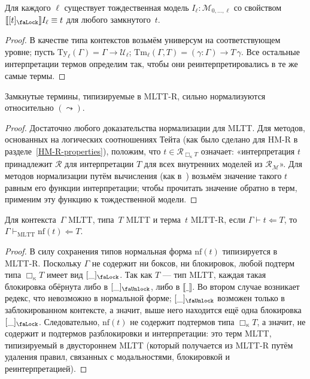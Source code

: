 \begin{theorem}
    Для каждого $\ell$ существует тождественная модель
    $I_\ell:\mathcal{M}_{0,\ldots,\ell}$ со свойством
    $\llbracket [t]_\text{\faLock}\rrbracket I_\ell
    \equiv t$ для любого замкнутого~$t$.
\end{theorem}
\begin{proof}
    В качестве типа контекстов возьмём универсум на
    соответствующем уровне; пусть
    $\mathrm{Ty}_\ell(\Gamma)=
    \Gamma\to\mathcal{U}_\ell$;
    $\mathrm{Tm}_\ell(\Gamma, T)=(\gamma:\Gamma)\to
    T\,\gamma$. Все остальные интерпретации термов
    определим так, чтобы они реинтерпретировались в те
    же самые термы.
\end{proof}

\begin{theorem}
    \label{mltt-r-sn}
    Замкнутые термины, типизируемые в MLTT-R, сильно
    нормализуются относительно $(\leadsto)$.
\end{theorem}
\begin{proof}
    Достаточно любого доказательства нормализации для
    MLTT. Для методов, основанных на логических
    соотношениях Тейта (как было сделано для HM-R в
    разделе~\ref{HM-R-properties}), положим, что
    $t\in\mathcal{R}_{\Box_\kappa T}$ означает:
    «интерпретация $t$ принадлежит $\mathcal{R}$ для
    интерпретации $T$ для всех внутренних моделей из
    $\mathcal{R}_\mathcal{M}$». Для методов
    нормализации путём вычисления (как
    в~\cite{ABEL200717}) возьмём значение такого $t$
    равным его функции интерпретации; чтобы прочитать
    значение обратно в терм, применим эту функцию к
    тождественной модели.
\end{proof}

\begin{theorem}
    Для контекста~$\Gamma$ MLTT, типа~$T$ MLTT и
    терма~$t$ MLTT-R, если
    $\Gamma\vdash t\Leftarrow T$, то
    $\Gamma\vdash_\mathrm{MLTT}\mathrm{nf}(t)
        \Leftarrow T$.
\end{theorem}
\begin{proof}
    В силу сохранения типов нормальная форма
    $\mathrm{nf}(t)$ типизируется в MLTT-R. Поскольку
    $\Gamma$ не содержит ни боксов, ни блокировок,
    любой подтерм типа $\Box_\kappa T$ имеет вид
    $[\_]_\text{\faLock}$. Так как $T$ --- тип MLTT,
    каждая такая блокировка обёрнута либо в
    $[\_]_\text{\faUnlock}$, либо в
    $\llbracket\_ \rrbracket$. Во втором случае
    возникает редекс, что невозможно в нормальной
    форме; $[\_]_\text{\faUnlock}$ возможен только в
    заблокированном контексте, а значит, выше него
    находится ещё одна блокировка
    $[\_]_\text{\faLock}$. Следовательно,
    $\mathrm{nf}(t)$ не содержит подтермов типа
    $\Box_\kappa T$, а значит, не содержит и подтермов
    разблокировки и интерпретации: это терм MLTT,
    типизируемый в двустороннем MLTT (который
    получается из MLTT-R путём удаления правил,
    связанных с модальностями, блокировкой и
    реинтерпретацией).
\end{proof}

